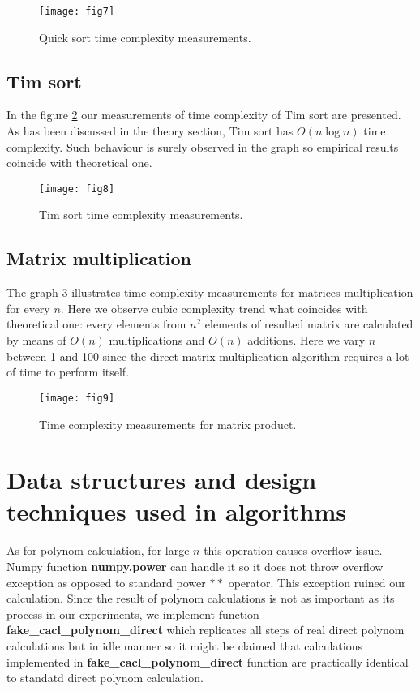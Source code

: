 \documentclass[12pt, bachelor, substylefile = algo_title.rtx]{disser}
\theoremstyle{definition}
\begin{document}
\begin{figure}[h]
\begin{center}
\texttt{[image: fig7]}
\caption{Quick sort time complexity measurements.}
\label{fig: 7}
\end{center}
\end{figure}

\subsection{Tim sort}

In the figure \ref{fig: 8} our measurements of time complexity of Tim sort are presented. As has been discussed in the theory section, Tim sort has $O(n\log n)$ time complexity. Such behaviour is surely observed in the graph so empirical results coincide with theoretical one.

\begin{figure}[h]
\begin{center}
\texttt{[image: fig8]}
\caption{Tim sort time complexity measurements.}
\label{fig: 8}
\end{center}
\end{figure}

\subsection{Matrix multiplication}
The graph \ref{fig: 9} illustrates time complexity measurements for matrices multiplication for every $n$. Here we observe cubic complexity trend what coincides with theoretical one: every elements from $n^2$ elements of resulted matrix are calculated by means of $O(n)$ multiplications and $O(n)$ additions. Here we vary $n$ between 1 and 100 since the direct matrix multiplication algorithm requires a lot of time to perform itself.

\begin{figure}[h]
\begin{center}
\texttt{[image: fig9]}
\caption{Time complexity measurements for matrix product.}
\label{fig: 9}
\end{center}
\end{figure}

\section{Data structures and design techniques used in algorithms}
As for polynom calculation, for large $n$ this operation causes overflow issue. Numpy function \textbf{numpy.power} can handle it so it does not throw overflow exception as opposed to standard power $**$ operator. This exception ruined our calculation. Since the result of polynom calculations is not as important as its process in our experiments, we implement function \textbf{fake\_cacl\_polynom\_direct} which replicates all steps of real direct polynom calculations but in idle manner so it might be claimed that calculations implemented in \textbf{fake\_cacl\_polynom\_direct} function are practically identical to standatd direct polynom calculation.
\end{document}
